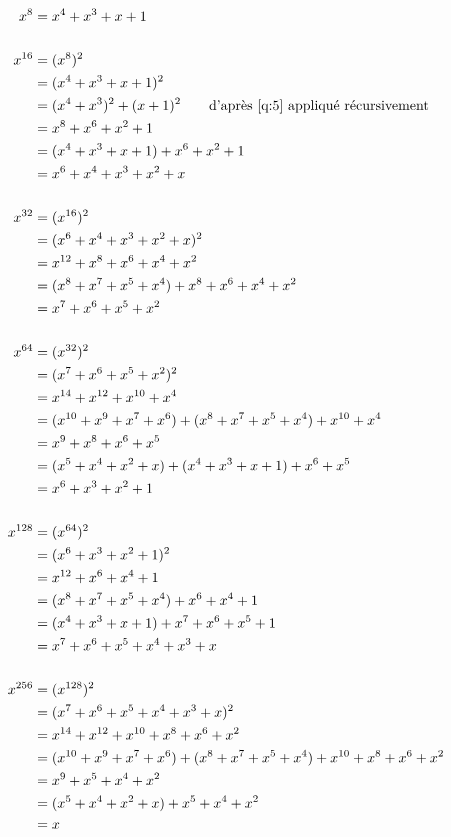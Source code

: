\documentclass[a4paper, 12pt]{article}
\begin{document}
\begin{enumerate}[label=\textbf{Question \arabic*.}, leftmargin=*]
\begin{align*}
    x^8 &= x^4 + x^3 + x + 1 \\
    \\
    x^{16} &= (x^8)^2 \\
    &= (x^4 + x^3 + x + 1)^2 \\
    &= (x^4 + x^3)^2 + (x + 1)^2 \qquad \text{d'après \ref{q:5} appliqué récursivement} \\
    &= x^8 + x^6 + x^2 + 1 \\
    &= (x^4 + x^3 + x + 1) + x^6 + x^2 + 1 \\
    &= x^6 + x^4 + x^3 + x^2 + x \\
    \\
    x^{32} &= (x^{16})^2 \\
    &= (x^6 + x^4 + x^3 + x^2 + x)^2 \\
    &= x^{12} + x^8 + x^6 + x^4 + x^2 \\
    &= (x^8 + x^7 + x^5 + x^4) + x^8 + x^6 + x^4 + x^2 \\
    &= x^7 + x^6 + x^5 + x^2 \\
    \\
    x^{64} &= (x^{32})^2 \\
    &= (x^7 + x^6 + x^5 + x^2)^2 \\
    &= x^{14} + x^{12} + x^{10} + x^4 \\
    &= (x^{10} + x^9 + x^7 + x^6) + (x^8 + x^7 + x^5 + x^4) + x^{10} + x^4 \\
    &= x^9 + x^8 + x^6 + x^5 \\
    &= (x^5 + x^4 + x^2 + x) + (x^4 + x^3 + x + 1) + x^6 + x^5 \\
    &= x^6 + x^3 + x^2 + 1 \\
    \\
    x^{128} &= (x^{64})^2 \\
    &= (x^6 + x^3 + x^2 + 1)^2 \\
    &= x^{12} + x^6 + x^4 + 1 \\
    &= (x^8 + x^7 + x^5 + x^4) + x^6 + x^4 + 1 \\
    &= (x^4 + x^3 + x + 1) + x^7 + x^6 + x^5 + 1 \\
    &= x^7 + x^6 + x^5 + x^4 + x^3 + x \\
    \\
    x^{256} &= (x^{128})^2 \\
    &= (x^7 + x^6 + x^5 + x^4 + x^3 + x)^2 \\
    &= x^{14} + x^{12} + x^{10} + x^8 + x^6 + x^2 \\
    &= (x^{10} + x^9 + x^7 + x^6) + (x^8 + x^7 + x^5 + x^4) + x^{10} + x^8 + x^6 + x^2 \\
    &= x^9 + x^5 + x^4 + x^2 \\
    &= (x^5 + x^4 + x^2 + x) + x^5 + x^4 + x^2 \\
    &= x
\end{align*}


\end{enumerate}
\end{document}
